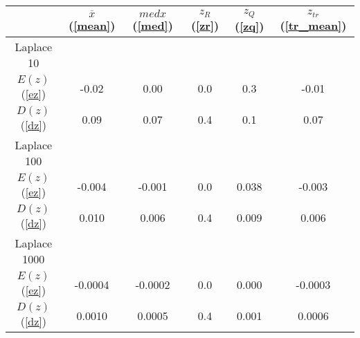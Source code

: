 \begin{tabular}{|c|c|c|c|c|c|}
\hline
 & $\overline{x}$ (\ref{mean}) & $med x$ (\ref{med}) & $z_R$ (\ref{zr}) & $z_Q$ (\ref{zq}) & $z_{tr}$ (\ref{tr_mean})\\
\hline
Laplace 10 &  &  &  &  & \\
\hline
$E(z)$ (\ref{ez}) & -0.02 & 0.00 & 0.0 & 0.3 & -0.01\\
\hline
$D(z)$ (\ref{dz}) & 0.09 & 0.07 & 0.4 & 0.1 & 0.07\\
\hline
Laplace 100 &  &  &  &  & \\
\hline
$E(z)$ (\ref{ez}) & -0.004 & -0.001 & 0.0 & 0.038 & -0.003\\
\hline
$D(z)$ (\ref{dz}) & 0.010 & 0.006 & 0.4 & 0.009 & 0.006\\
\hline
Laplace 1000 &  &  &  &  & \\
\hline
$E(z)$ (\ref{ez}) & -0.0004 & -0.0002 & 0.0 & 0.000 & -0.0003\\
\hline
$D(z)$ (\ref{dz}) & 0.0010 & 0.0005 & 0.4 & 0.001 & 0.0006\\
\hline
\end{tabular}

